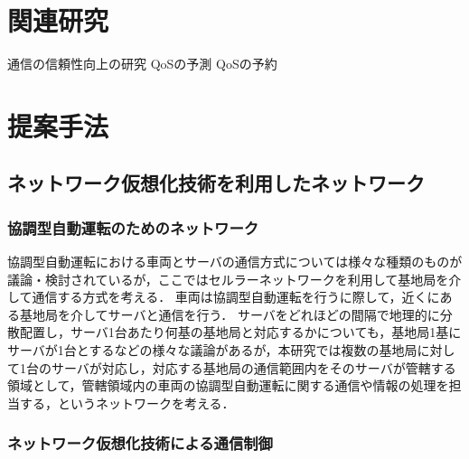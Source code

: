 \documentclass[a4paper,11pt,uplatex]{ujreport}
\begin{document}

\chapter{関連研究}
\label{chap:関連研究}

  通信の信頼性向上の研究
  QoSの予測
  QoSの予約


\chapter{提案手法}
\label{chap:提案手法}

\section{ネットワーク仮想化技術を利用したネットワーク}
\label{sec:ネットワーク仮想化技術を利用したネットワーク}

\subsection{協調型自動運転のためのネットワーク}

協調型自動運転における車両とサーバの通信方式については様々な種類のものが議論・検討されているが，ここではセルラーネットワークを利用して基地局を介して通信する方式を考える．
車両は協調型自動運転を行うに際して，近くにある基地局を介してサーバと通信を行う．
サーバをどれほどの間隔で地理的に分散配置し，サーバ1台あたり何基の基地局と対応するかについても，基地局1基にサーバが1台とするなどの様々な議論があるが，本研究では複数の基地局に対して1台のサーバが対応し，対応する基地局の通信範囲内をそのサーバが管轄する領域として，管轄領域内の車両の協調型自動運転に関する通信や情報の処理を担当する，というネットワークを考える．


\subsection{ネットワーク仮想化技術による通信制御}
\end{document}
